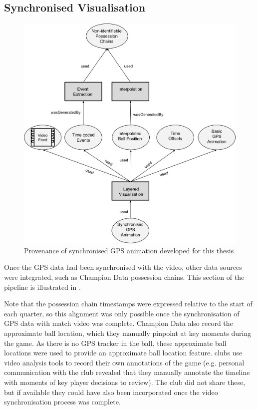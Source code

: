 \subsection{Synchronised Visualisation}

\begin{figure}[H]
\centering
\includegraphics[width=\linewidth]{figs/prov/prov-6.png}
\caption{Provenance of synchronised GPS animation developed for this thesis \notationdetails{}
\label{fig:prov6}}
\end{figure}

\pagebreak{}

Once the GPS data had been synchronised with the video, other data sources were integrated, such as Champion Data possession chains. This section of the pipeline is illustrated in .

Note that the possession chain timestamps were expressed relative to the start of each quarter, so this alignment was only possible once the synchronisation of GPS data with match video was complete. Champion Data also record the approximate ball location, which they manually pinpoint at key moments during the game. As there is no GPS tracker in the ball, these approximate ball locations were used to provide an approximate ball location feature. \afl{} clubs use video analysis tools to record their own annotations of the game (e.g. personal communication with the club revealed that they manually annotate the timeline with moments of key player decisions to review). The club did not share these, but if available they could have also been incorporated once the video synchronisation process was complete.

